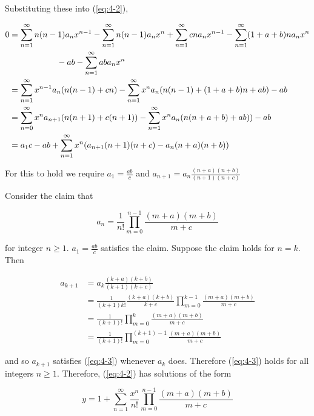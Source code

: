 \documentclass{article}
\newcommand\tab[1][1cm]{\hspace*{#1}}
\begin{document}
Substituting these into (\ref{eq:4-2}),

\begin{align*}
    0 &= \sum_{n = 1}^\infty n(n - 1)a_nx^{n - 1} - \sum_{n = 1}^\infty n(n - 1)a_nx^n
        + \sum_{n = 1}^\infty cna_nx^{n - 1} - \sum_{n = 1}^\infty (1 + a + b)na_nx^{n}\\
    &\text{\tab\tab} - ab - \sum_{n = 1}^\infty aba_nx^n\\
    &= \sum_{n = 1}^\infty x^{n - 1}a_n(n(n - 1) + cn)
        - \sum_{n = 1}^\infty x^na_n(n(n - 1) + (1 + a + b)n + ab) - ab\\
    &= \sum_{n = 0}^\infty x^{n}a_{n + 1}(n(n + 1) + c(n + 1))
        - \sum_{n = 1}^\infty x^na_n(n(n + a + b) + ab)) - ab\\
    &= a_1c - ab + \sum_{n = 1}^\infty x^{n}(a_{n + 1}(n + 1)(n + c) - a_n(n + a)(n + b))
\end{align*}

For this to hold we require $a_1 = \frac{ab}{c}$ and $a_{n + 1} = a_n\frac{(n + a)(n + b)}{(n + 1)(n + c)}$

\newpage
Consider the claim that

\begin{equation} \label{eq:4-3}
    a_n = \frac{1}{n!}\prod_{m = 0}^{n - 1} \frac{(m + a)(m + b)}{m + c}
\end{equation}

for integer $n \geq 1$. $a_1 = \frac{ab}{c}$ satisfies the claim. Suppose the claim holds
for $n = k$. Then

\begin{align*}
    a_{k + 1} &= a_k \frac{(k + a)(k + b)}{(k + 1)(k + c)}\\
    &= \frac{1}{(k + 1)k!} \frac{(k + a)(k + b)}{k + c} \prod_{m = 0}^{k - 1} \frac{(m + a)(m + b)}{m + c}\\
    &= \frac{1}{(k + 1)!} \prod_{m = 0}^{k} \frac{(m + a)(m + b)}{m + c}\\
    &= \frac{1}{(k + 1)!} \prod_{m = 0}^{(k + 1) - 1} \frac{(m + a)(m + b)}{m + c}
\end{align*}

and so $a_{k + 1}$ satisfies (\ref{eq:4-3}) whenever $a_{k}$ does. Therefore (\ref{eq:4-3}) holds
for all integers $n \geq 1$. Therefore, (\ref{eq:4-2}) has solutions of the form

\begin{equation*}
    y = 1 + \sum_{n = 1}^\infty \frac{x^n}{n!}\prod_{m = 0}^{n - 1} \frac{(m + a)(m + b)}{m + c}
\end{equation*}
\end{document}
